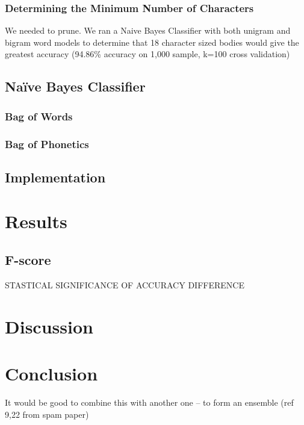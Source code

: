 \documentclass[draft,10pt]{article}
\begin{document}
\subsubsection{Determining the Minimum Number of Characters}
\label{sec-2-2-4}

We needed to prune. We ran a Naive Bayes Classifier with both unigram and
bigram word models to determine that 18 character sized bodies would give the
greatest accuracy (94.86\% accuracy on 1,000 sample, k=100 cross validation)
\subsection{Naïve Bayes Classifier}
\label{sec-2-3}
\subsubsection{Bag of Words}
\label{sec-2-3-1}
\subsubsection{Bag of Phonetics}
\label{sec-2-3-2}
\subsection{Implementation}
\label{sec-2-4}
\section{Results}
\label{sec-3}
\subsection{F-score}
\label{sec-3-1}

STASTICAL SIGNIFICANCE OF ACCURACY DIFFERENCE
\section{Discussion}
\label{sec-4}
\section{Conclusion}
It would be good to combine this with another one -- to form an ensemble (ref
9,22 from spam paper)
\label{sec-5}





\end{document}
